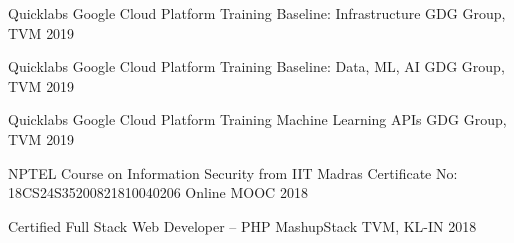 

\begin{cvhonors}

  \cvhonor
    {Quicklabs Google Cloud Platform Training} %
    {Baseline: Infrastructure} %
    {GDG Group, TVM} %
    {2019} %

  \cvhonor
    {Quicklabs Google Cloud Platform Training} %
    {Baseline: Data, ML, AI} %
    {GDG Group, TVM} %
    {2019} %

  \cvhonor
    {Quicklabs Google Cloud Platform Training} %
    {Machine Learning APIs} %
    {GDG Group, TVM} %
    {2019} %
    
  \cvhonor
    {NPTEL Course on Information Security from IIT Madras} %
    {Certificate No: 18CS24S35200821810040206} %
    {Online MOOC} %
    {2018} %

  \cvhonor
    {Certified Full Stack Web Developer – PHP} %
    {MashupStack} %
    {TVM, KL-IN} %
    {2018} %

    
\end{cvhonors}
